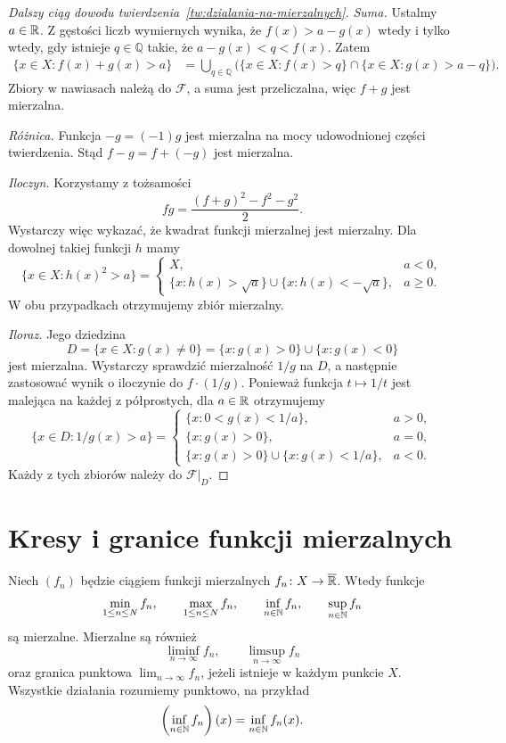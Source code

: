 
\begin{proof}[Dalszy ciąg dowodu twierdzenia~\ref{tw:dzialania-na-mierzalnych}]
\emph{Suma.} Ustalmy $a\in\mathbb{R}$. Z gęstości liczb wymiernych wynika,
że $f(x)>a-g(x)$ wtedy i tylko wtedy, gdy istnieje $q\in\mathbb{Q}$
takie, że $a-g(x)<q<f(x)$. Zatem
\begin{align*}
  \{x\in X:f(x)+g(x)>a\}
    &=\bigcup_{q\in\mathbb{Q}}
      \bigl(\{x\in X:f(x)>q\}\cap\{x\in X:g(x)>a-q\}\bigr).
\end{align*}
Zbiory w nawiasach należą do $\mathcal{F}$, a suma jest przeliczalna,
więc $f+g$ jest mierzalna.

\emph{Różnica.} Funkcja $-g=(-1)g$ jest mierzalna na mocy
udowodnionej części twierdzenia. Stąd $f-g=f+(-g)$ jest mierzalna.

\emph{Iloczyn.} Korzystamy z tożsamości
\[
  fg=\frac{(f+g)^2-f^2-g^2}{2}.
\]
Wystarczy więc wykazać, że kwadrat funkcji mierzalnej jest mierzalny.
Dla dowolnej takiej funkcji $h$ mamy
\[
  \{x\in X:h(x)^2>a\}
  =\begin{cases}
    X, & a<0,\\
    \{x:h(x)>\sqrt a\}\cup\{x:h(x)<-\sqrt a\}, & a\geq0.
  \end{cases}
\]
W obu przypadkach otrzymujemy zbiór mierzalny.

\emph{Iloraz.} Jego dziedzina
\[
  D=\{x\in X:g(x)\neq0\}
   =\{x:g(x)>0\}\cup\{x:g(x)<0\}
\]
jest mierzalna. Wystarczy sprawdzić mierzalność $1/g$ na $D$,
a następnie zastosować wynik o iloczynie do $f\cdot(1/g)$.
Ponieważ funkcja $t\mapsto1/t$ jest malejąca na każdej z półprostych,
dla $a\in\mathbb{R}$ otrzymujemy
\[
  \{x\in D:1/g(x)>a\}
  =\begin{cases}
    \{x:0<g(x)<1/a\}, & a>0,\\
    \{x:g(x)>0\}, & a=0,\\
    \{x:g(x)>0\}\cup\{x:g(x)<1/a\}, & a<0.
  \end{cases}
\]
Każdy z tych zbiorów należy do $\mathcal{F}|_D$.
\end{proof}

\section{Kresy i granice funkcji mierzalnych}
\label{sec:kresy-granice-mierzalnych}

\begin{twierdzenie}
\label{tw:kresy-granice-mierzalnych}
Niech $(f_n)$ będzie ciągiem funkcji mierzalnych
$f_n\colon X\to\overline{\mathbb{R}}$. Wtedy funkcje
\[
  \min_{1\leq n\leq N}f_n,\qquad
  \max_{1\leq n\leq N}f_n,\qquad
  \inf_{n\in\mathbb{N}}f_n,\qquad
  \sup_{n\in\mathbb{N}}f_n
\]
są mierzalne. Mierzalne są również
\[
  \liminf_{n\to\infty}f_n,\qquad
  \limsup_{n\to\infty}f_n
\]
oraz granica punktowa $\lim_{n\to\infty}f_n$, jeżeli istnieje
w każdym punkcie $X$.
Wszystkie działania rozumiemy punktowo, na przykład
\[
  \left(\inf_{n\in\mathbb{N}}f_n\right)(x)=\inf_{n\in\mathbb{N}}f_n(x).
\]
\end{twierdzenie}

